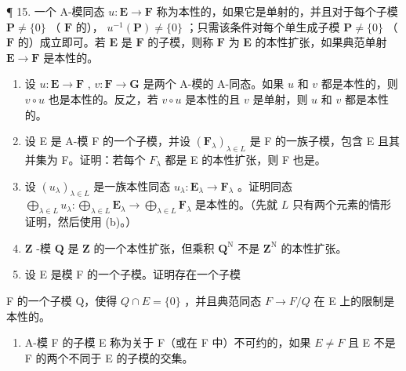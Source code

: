 ¶ 15. 一个 A-模同态 \(u: \mathbf{E} \to \mathbf{F}\) 称为本性的，如果它是单射的，并且对于每个子模 \(\mathbf{P} \neq \{0\}\) （ \(\mathbf{F}\) 的）， \(u^{-1}(\mathbf{P}) \neq \{0\}\) ；只需该条件对每个单生成子模 \(\mathbf{P} \neq \{0\}\) （ \(\mathbf{F}\) 的）成立即可。若 \(\mathbf{E}\) 是 \(\mathbf{F}\) 的子模，则称 \(\mathbf{F}\) 为 \(\mathbf{E}\) 的本性扩张，如果典范单射 \(\mathbf{E} \to \mathbf{F}\) 是本性的。

\begin{enumerate}
\def\labelenumi{(\alph{enumi})}
\item
  设 \(u: \mathbf{E} \to \mathbf{F}\) , \(v: \mathbf{F} \to \mathbf{G}\) 是两个 A-模的 A-同态。如果 \(u\) 和 \(v\) 都是本性的，则 \(v \circ u\) 也是本性的。反之，若 \(v \circ u\) 是本性的且 \(v\) 是单射，则 \(u\) 和 \(v\) 都是本性的。
\item
  设 E 是 A-模 F 的一个子模，并设 \((\mathbf{F}_{\lambda})_{\lambda \in L}\) 是 F 的一族子模，包含 E 且其并集为 F。证明：若每个 \(F_{\lambda}\) 都是 E 的本性扩张，则 F 也是。
\item
  设 \((u_{\lambda})_{\lambda \in L}\) 是一族本性同态 \(u_{\lambda} \colon \mathbf{E}_{\lambda} \to \mathbf{F}_{\lambda}\) 。证明同态 \(\bigoplus_{\lambda \in L} u_{\lambda} \colon \bigoplus_{\lambda \in L} \mathbf{E}_{\lambda} \to \bigoplus_{\lambda \in L} \mathbf{F}_{\lambda}\) 是本性的。（先就 \(L\) 只有两个元素的情形证明，然后使用 (b)。）
\item
  \(\mathbf{Z}\) -模 \(\mathbf{Q}\) 是 \(\mathbf{Z}\) 的一个本性扩张，但乘积 \(\mathbf{Q}^{\mathrm{N}}\) 不是 \(\mathbf{Z}^{\mathrm{N}}\) 的本性扩张。
\item
  设 E 是模 F 的一个子模。证明存在一个子模
\end{enumerate}

F 的一个子模 Q，使得 \(Q \cap E = \{0\}\) ，并且典范同态 \(F \to F/Q\) 在 E 上的限制是本性的。

\begin{enumerate}
\def\labelenumi{\arabic{enumi}.}
\setcounter{enumi}{15}
\tightlist
\item
  A-模 F 的子模 E 称为关于 F（或在 F 中）不可约的，如果 \(E \neq F\) 且 E 不是 F 的两个不同于 E 的子模的交集。
\end{enumerate}


